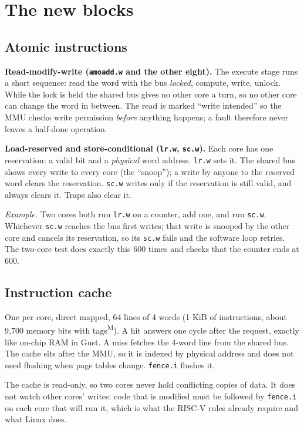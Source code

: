 \documentclass[10pt,a4paper]{article}
\newcommand{\code}[1]{\texttt{#1}}
\newcommand{\meas}{\textsuperscript{M}}
\begin{document}
\section{The new blocks}
\subsection{Atomic instructions}
\textbf{Read-modify-write (\code{amoadd.w} and the other eight).} The execute stage runs a short sequence:
read the word with the bus \emph{locked}, compute, write, unlock. While the lock is held the shared bus
gives no other core a turn, so no other core can change the word in between. The read is marked ``write
intended'' so the MMU checks write permission \emph{before} anything happens; a fault therefore never
leaves a half-done operation.

\textbf{Load-reserved and store-conditional (\code{lr.w}, \code{sc.w}).} Each core has one reservation: a
valid bit and a \emph{physical} word address. \code{lr.w} sets it. The shared bus shows every write to
every core (the ``snoop''); a write by anyone to the reserved word clears the reservation. \code{sc.w}
writes only if the reservation is still valid, and always clears it. Traps also clear it.

\emph{Example.} Two cores both run \code{lr.w} on a counter, add one, and run \code{sc.w}. Whichever
\code{sc.w} reaches the bus first writes; that write is snooped by the other core and cancels its
reservation, so its \code{sc.w} fails and the software loop retries. The two-core test does exactly this
600 times and checks that the counter ends at 600.

\subsection{Instruction cache}
One per core, direct mapped, 64 lines of 4 words (1 KiB of instructions, about 9{,}700 memory bits with
tags\meas). A hit answers one cycle after the request, exactly like on-chip RAM in Gust. A miss fetches
the 4-word line from the shared bus. The cache sits after the MMU, so it is indexed by physical address
and does not need flushing when page tables change. \code{fence.i} flushes it.

The cache is read-only, so two cores never hold conflicting copies of data. It does not watch other
cores' writes: code that is modified must be followed by \code{fence.i} on each core that will run it,
which is what the RISC-V rules already require and what Linux does.
\end{document}
